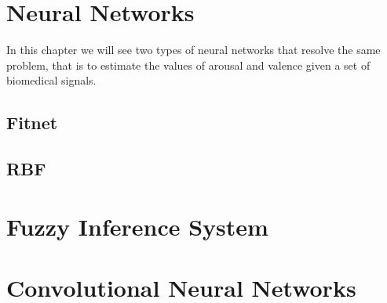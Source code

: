 \documentclass[a4paper]{report}
\begin{document}
\chapter{Neural Networks}
	\noindent In this chapter we will see two types of neural networks that resolve the same problem, that is to estimate the values of arousal and valence given a set of biomedical signals.	
	\section{Fitnet}
	\section{RBF}
	
	\chapter{Fuzzy Inference System}
	
	\chapter{Convolutional Neural Networks}
\end{document}

